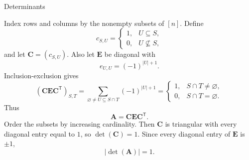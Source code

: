 \begin{expectedproblemgroup}{Determinants}
        \begin{expectedsubsolution}
            Index rows and columns by the nonempty subsets of $[n]$. Define
            \[
                c_{S,U}
                =
                \begin{cases}
                    1, & U\subseteq S,\\
                    0, & U\nsubseteq S,
                \end{cases}
            \]
            and let $\mathbf{C}=(c_{S,U})$. Also let $\mathbf{E}$ be diagonal with
            \[
                e_{U,U}=(-1)^{|U|+1}.
            \]
            Inclusion-exclusion gives
            \[
                (\mathbf{C}\mathbf{E}\mathbf{C}^{\mathsf{T}})_{S,T}
                =
                \sum_{\varnothing\neq U\subseteq S\cap T}(-1)^{|U|+1}
                =
                \begin{cases}
                    1, & S\cap T\neq\varnothing,\\
                    0, & S\cap T=\varnothing.
                \end{cases}
            \]
            Thus
            \[
                \mathbf{A}=\mathbf{C}\mathbf{E}\mathbf{C}^{\mathsf{T}}.
            \]
            Order the subsets by increasing cardinality. Then $\mathbf{C}$ is
            triangular with every diagonal entry equal to $1$, so
            $\det(\mathbf{C})=1$. Since every diagonal entry of $\mathbf{E}$ is
            $\pm1$,
            \[
                \boxed{|\det(\mathbf{A})|=1}.
            \]
        \end{expectedsubsolution}

    \end{expectedproblemgroup}


